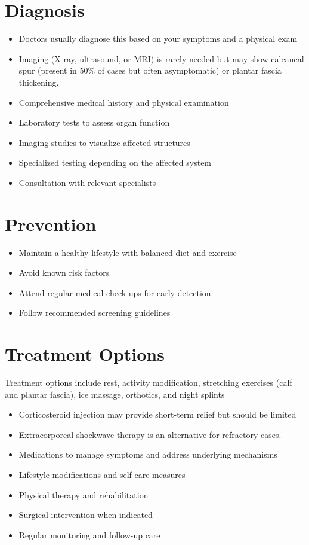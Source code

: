 \section{Diagnosis}
\begin{itemize}[noitemsep]
  \item Doctors usually diagnose this based on your symptoms and a physical exam
  \item Imaging (X-ray, ultrasound, or MRI) is rarely needed but may show calcaneal spur (present in 50\% of cases but often asymptomatic) or plantar fascia thickening.
  \item Comprehensive medical history and physical examination
  \item Laboratory tests to assess organ function
  \item Imaging studies to visualize affected structures
  \item Specialized testing depending on the affected system
  \item Consultation with relevant specialists
\end{itemize}
\section{Prevention}
\begin{itemize}[noitemsep]
  \item Maintain a healthy lifestyle with balanced diet and exercise
  \item Avoid known risk factors
  \item Attend regular medical check-ups for early detection
  \item Follow recommended screening guidelines
\end{itemize}
\section{Treatment Options}
Treatment options include rest, activity modification, stretching exercises (calf and plantar fascia), ice massage, orthotics, and night splints

\begin{itemize}[noitemsep]
  \item Corticosteroid injection may provide short-term relief but should be limited
  \item Extracorporeal shockwave therapy is an alternative for refractory cases.
  \item Medications to manage symptoms and address underlying mechanisms
  \item Lifestyle modifications and self-care measures
  \item Physical therapy and rehabilitation
  \item Surgical intervention when indicated
  \item Regular monitoring and follow-up care
\end{itemize}
